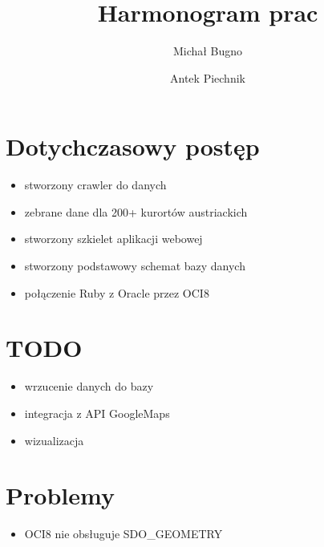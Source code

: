 \documentclass[12pt]{article}
\author{Michał Bugno \and Antek Piechnik}
\title{Harmonogram prac}
\begin{document}
\maketitle

\section{Dotychczasowy postęp}
\begin{itemize}
\item stworzony crawler do danych
\item zebrane dane dla 200+ kurortów austriackich
\item stworzony szkielet aplikacji webowej
\item stworzony podstawowy schemat bazy danych
\item połączenie Ruby z Oracle przez OCI8
\end{itemize}

\section{TODO}
\begin{itemize}
\item wrzucenie danych do bazy
\item integracja z API GoogleMaps
\item wizualizacja
\end{itemize}

\section{Problemy}
\begin{itemize}
\item OCI8 nie obsługuje SDO\_GEOMETRY
\end{itemize}
\end{document}
